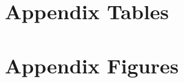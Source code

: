 \documentclass{article}[12pt,subeqn]
\newcommand{\MMRfolder}{"."}
\begin{document}
\begin{spacing}{1.4}
\newpage
\section{Appendix Tables}
\label{scn:appTables}


\newpage
\section{Appendix Figures}
\label{scn:appFigures}

%

\end{spacing}
\end{document}
